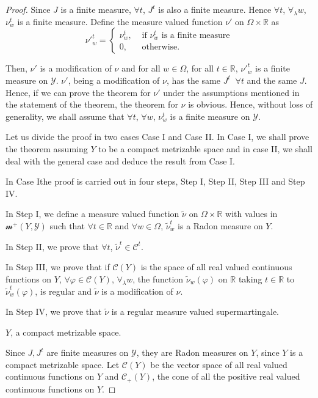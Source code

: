 \begin{proof}
Since $J$ is a finite measure, $\forall t$, $J^t$ is also a finite
measure. Hence $\forall t$, $\forall_\lambda w$, $\nu^t_w $ is a
finite measure. Define the measure valued function $\nu'$ on $\Omega
\times \mathbb{R}$ as 
$$ 
{\nu'}^t_w = 
\begin{cases}
\nu^t_w, & \text{ if } \nu^t_w \text{ is a finite measure}\\
0, & \text{ otherwise}.
\end{cases}
$$

Then, $\nu'$ is a modification of $\nu$ and for all $w \in \Omega$,
for all $t \in \mathbb{R}$, ${\nu'}^t_w$ is a finite measure on
$\mathscr{Y}$. $\nu'$, being a modification of $\nu$, has the same
$J^t \;\; \forall t$ and the same $J$. Hence, if we can prove the theorem
for $\nu'$ under the assumptions mentioned in the statement of the
theorem, the theorem for $\nu$ is obvious. Hence, without loss of
generality, we shall assume that $\forall t$, $\forall w$, $\nu^t_w$
is a finite measure on $\mathscr{Y}$. 

Let us divide the proof in two cases Case I and Case II. In Case I, we
shall prove the theorem assuming $Y$ to be a compact metrizable space
and in case II, we shall deal with the general case and deduce the
result from Case I.

In Case I\pageoriginale the proof is carried out in four steps, Step
I, Step II, Step III and Step IV.

In Step I, we define a measure valued function $\tilde{\nu}$ on
$\Omega \times \mathbb{R}$ with values in $\mathscr{m}^+ (Y,
\mathscr{Y}) $ such that $\forall t\in \mathbb{R}$ and $\forall w \in
\Omega$, $\tilde{\nu}^t_w$ is a Radon measure on $Y$. 

In Step II, we prove that $\forall t$, $\tilde{\nu}^t \in
\mathscr{C}^t$. 

In Step III, we prove that if $\mathscr{C}(Y)$ is the space of all
real valued continuous functions on $Y$, $\forall \varphi \in
\mathscr{C} (Y)$, $\forall_\lambda w$, the function
$\tilde{\nu}_w(\varphi)$ on $\mathbb{R}$ taking $t \in \mathbb{R}$ to
$\tilde{\nu}^t_w (\varphi)$, is regular and $\tilde{\nu}$ is a
modification of $\nu$. 

In Step IV, we prove that $\tilde{\nu}$ is a regular measure valued
supermartingale. 

\medskip
{} $Y$, a compact metrizable space.

Since $J, J^t$ are finite measures on $\mathscr{Y}$, they are Radon
measures on $Y$, since $Y$ is a compact metrizable space. Let
$\mathscr{C}(Y)$ be the vector space of all real valued continuous
functions on $Y$ and $\mathscr{C}_+(Y)$, the cone of all the positive
real valued continuous functions on $Y$. 


\end{proof}
